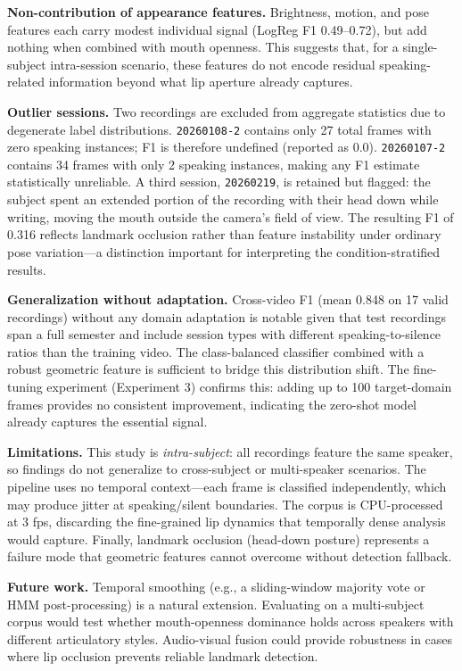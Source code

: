\documentclass[conference]{IEEEtran}
\begin{document}
\textbf{Non-contribution of appearance features.}
Brightness, motion, and pose features each carry modest individual signal
(LogReg F1 0.49--0.72), but add nothing when combined with mouth openness.
This suggests that, for a single-subject intra-session scenario, these
features do not encode residual speaking-related information beyond what
lip aperture already captures.

\textbf{Outlier sessions.}
Two recordings are excluded from aggregate statistics due to degenerate label
distributions.
\texttt{20260108-2} contains only 27 total frames with zero speaking instances;
F1 is therefore undefined (reported as 0.0).
\texttt{20260107-2} contains 34 frames with only 2 speaking instances,
making any F1 estimate statistically unreliable.
A third session, \texttt{20260219}, is retained but flagged: the subject
spent an extended portion of the recording with their head down while writing,
moving the mouth outside the camera's field of view.
The resulting F1 of 0.316 reflects landmark occlusion rather than feature
instability under ordinary pose variation—a distinction important for
interpreting the condition-stratified results.

\textbf{Generalization without adaptation.}
Cross-video F1 (mean 0.848 on 17 valid recordings) without any domain adaptation
is notable given that test recordings span a full semester and include session
types with different speaking-to-silence ratios than the training video.
The class-balanced classifier combined with a robust geometric feature is
sufficient to bridge this distribution shift.
The fine-tuning experiment (Experiment 3) confirms this: adding up to 100
target-domain frames provides no consistent improvement, indicating the
zero-shot model already captures the essential signal.

\textbf{Limitations.}
This study is \emph{intra-subject}: all recordings feature the same speaker,
so findings do not generalize to cross-subject or multi-speaker scenarios.
The pipeline uses no temporal context—each frame is classified independently,
which may produce jitter at speaking/silent boundaries.
The corpus is CPU-processed at 3 fps, discarding the fine-grained lip dynamics
that temporally dense analysis would capture.
Finally, landmark occlusion (head-down posture) represents a failure mode
that geometric features cannot overcome without detection fallback.

\textbf{Future work.}
Temporal smoothing (e.g., a sliding-window majority vote or HMM post-processing)
is a natural extension.
Evaluating on a multi-subject corpus would test whether mouth-openness dominance
holds across speakers with different articulatory styles.
Audio-visual fusion could provide robustness in cases where lip occlusion prevents
reliable landmark detection.
\end{document}
